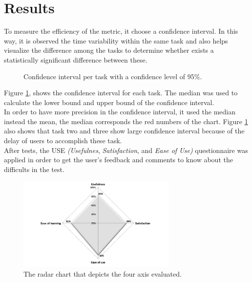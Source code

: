 \section{Results}

To measure the efficiency of the metric, it choose a confidence
interval. In this way, it is observed the time variability within the
same task and also helps visualize the difference among the tasks to
determine whether exists a statistically significant difference
between these. \\
\begin{figure}
\centering
\captionsetup{font=footnotesize}
\caption{Confidence interval per task with a confidence level of 95\%.}
\label{fig:ci95}   
\end{figure}
Figure  \ref{fig:ci95}, shows the confidence interval for each task.
The median was used to calculate the  lower bound and upper bound of
the confidence interval. \\In  order to have more precision in the
confidence interval, it used the median instead the mean, the median
corresponds the red numbers of the chart. Figure  \ref{fig:ci95} also 
shows that task two and three show large confidence interval because of  
the delay of users to accomplish these task. \\ 
After tests, the USE \textit{(Usefulnes}, \textit{Satisfaction}, and 
\textit{Ease of Use)} questionnaire  \cite{morris2001experience} 
was applied in order to get the user's feedback and comments 
to know about the difficults in the test.  
\begin{figure}
\centering
\small
\captionsetup{font=footnotesize}
\includegraphics[width=0.7\textwidth]{img/radial.png}
\caption{\small{The radar chart that depicts the four axis 
evaluated.}}
\label{fig:radial}   
\end{figure}

